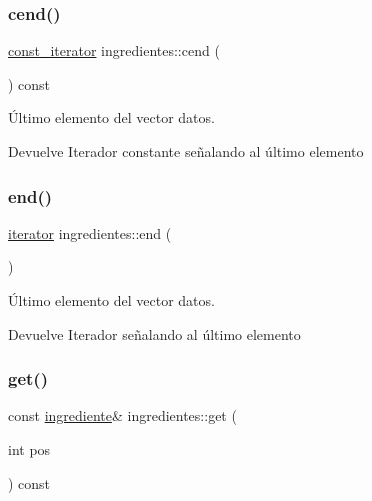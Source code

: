 \subsubsection{\texorpdfstring{cend()}{cend()}}
{\footnotesize\ttfamily \hyperlink{classingredientes_ac84040efbb789929ebe9177605bb890a}{const\+\_\+iterator} ingredientes\+::cend (\begin{DoxyParamCaption}{ }\end{DoxyParamCaption}) const\hspace{0.3cm}{\ttfamily [inline]}}



Último elemento del vector datos. 

\begin{DoxyReturn}{Devuelve}
Iterador constante señalando al último elemento 
\end{DoxyReturn}
\mbox{\label{classingredientes_a52a01bdabf8b52426c12976badcee775}} 
\subsubsection{\texorpdfstring{end()}{end()}}
{\footnotesize\ttfamily \hyperlink{classingredientes_af0cadce160cefe5482ca7d55ef86c893}{iterator} ingredientes\+::end (\begin{DoxyParamCaption}{ }\end{DoxyParamCaption})\hspace{0.3cm}{\ttfamily [inline]}}



Último elemento del vector datos. 

\begin{DoxyReturn}{Devuelve}
Iterador señalando al último elemento 
\end{DoxyReturn}
\mbox{\label{classingredientes_a2d4257359160b39365b1aac2ec6a1166}} 
\subsubsection{\texorpdfstring{get()}{get()}\hspace{0.1cm}{\footnotesize\ttfamily [1/2]}}
{\footnotesize\ttfamily const \hyperlink{classingrediente}{ingrediente}\& ingredientes\+::get (\begin{DoxyParamCaption}\item[{int}]{pos }\end{DoxyParamCaption}) const}



